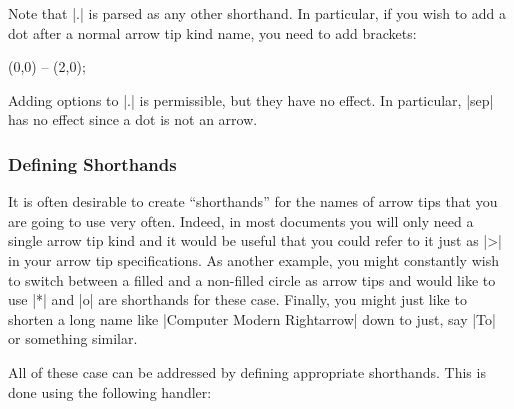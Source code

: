 Note that |.| is parsed as any other shorthand. In particular, if you
wish to add a dot after a normal arrow tip kind name, you need to add
brackets:
\begin{codeexample}[]
  (0,0) -- (2,0);
\end{codeexample}
Adding options to |.| is permissible, but they have no effect. In
particular, |sep| has no effect since a dot is not an arrow.




\subsubsection{Defining Shorthands}
\label{section-arrow-tip-macro}

It is often desirable to create ``shorthands'' for the names of arrow
tips that you are going to use very often. Indeed, in most documents
you will only need a single arrow tip kind and it would be useful that
you could refer to it just as |>| in your arrow tip specifications. As
another example, you might constantly wish to switch between a filled
and a non-filled circle as arrow tips and would like to use |*| and
|o| are shorthands for these case. Finally, you might just like to
shorten a long name like |Computer Modern Rightarrow| down to just,
say |To| or something similar.

All of these case can be addressed by defining appropriate
shorthands. This is done using the following handler:

